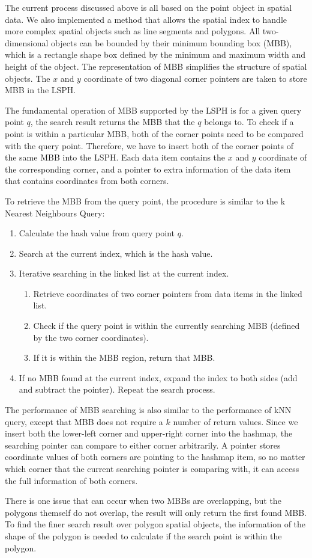 The current process discussed above is all based on the point object in spatial data. We also implemented a method that allows the spatial index to handle more complex spatial objects such as line segments and polygons. All two-dimensional objects can be bounded by their minimum bounding box (MBB), which is a rectangle shape box defined by the minimum and maximum width and height of the object. The representation of MBB simplifies the structure of spatial objects. The $x$ and $y$ coordinate of two diagonal corner pointers are taken to store MBB in the LSPH.  

The fundamental operation of MBB supported by the LSPH is for a given query point $q$, the search result returns the MBB that the $q$ belongs to. To check if a point is within a particular MBB, both of the corner points need to be compared with the query point. Therefore, we have to insert both of the corner points of the same MBB into the LSPH. Each data item contains the $x$ and $y$ coordinate of the corresponding corner, and a pointer to extra information of the data item that contains coordinates from both corners. 

To retrieve the MBB from the query point, the procedure is similar to the k Nearest Neighbours Query: 
\begin{enumerate}
    \item Calculate the hash value from query point $q$.
    \item Search at the current index, which is the hash value.
    \item Iterative searching in the linked list at the current index. 
    \begin{enumerate}
        \item Retrieve coordinates of two corner pointers from data items in the linked list. 
        \item Check if the query point is within the currently searching MBB (defined by the two corner coordinates).
        \item If it is within the MBB region, return that MBB.  
    \end{enumerate}
    \item If no MBB found at the current index, expand the index to both sides (add and subtract the pointer). Repeat the search process.
\end{enumerate}

The performance of MBB searching is also similar to the performance of kNN query, except that MBB does not require a $k$ number of return values. Since we insert both the lower-left corner and upper-right corner into the hashmap, the searching pointer can compare to either corner arbitrarily. A pointer stores coordinate values of both corners are pointing to the hashmap item, so no matter which corner that the current searching pointer is comparing with, it can access the full information of both corners. 

There is one issue that can occur when two MBBs are overlapping, but the polygons themself do not overlap, the result will only return the first found MBB. To find the finer search result over polygon spatial objects, the information of the shape of the polygon is needed to calculate if the search point is within the polygon. 
